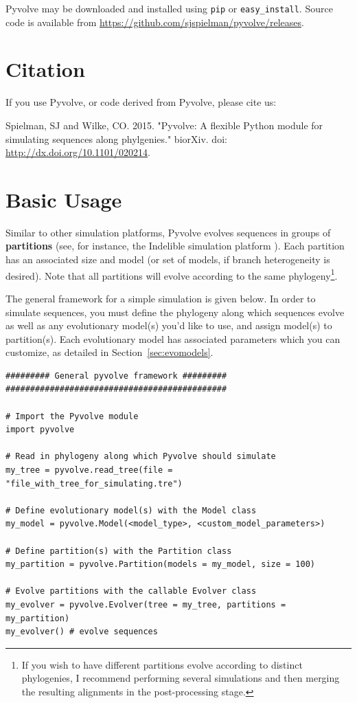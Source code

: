\documentclass{article}
\newcommand{\code}[1]{\texttt{\small{#1}}}
\begin{document}
Pyvolve may be downloaded and installed using \code{pip} or \code{easy\_install}. Source code is available from \href{https://github.com/sjspielman/pyvolve/releases}{https://github.com/sjspielman/pyvolve/releases}.

\section{Citation}

If you use Pyvolve, or code derived from Pyvolve, please cite us:

Spielman, SJ and Wilke, CO. 2015. "Pyvolve: A flexible Python module for simulating sequences along phylgenies." biorXiv. doi: \href{http://dx.doi.org/10.1101/020214}{http://dx.doi.org/10.1101/020214}.

\section{Basic Usage}

Similar to other simulation platforms, Pyvolve evolves sequences in groups of \textbf{partitions} (see, for instance, the Indelible simulation platform \citep{Fletcher2009}). Each partition has an associated size and model (or set of models, if branch heterogeneity is desired). Note that all partitions will evolve according to the same phylogeny\footnote{If you wish to have different partitions evolve according to distinct phylogenies, I recommend performing several simulations and then merging the resulting alignments in the post-processing stage.}. 

The general framework for a simple simulation is given below. In order to simulate sequences, you must define the phylogeny along which sequences evolve as well as any evolutionary model(s) you'd like to use, and assign model(s) to partition(s). Each evolutionary model has associated parameters which you can customize, as detailed in Section~\ref{sec:evomodels}.

\begin{lstlisting}
######### General pyvolve framework #########
#############################################

# Import the Pyvolve module
import pyvolve

# Read in phylogeny along which Pyvolve should simulate
my_tree = pyvolve.read_tree(file = "file_with_tree_for_simulating.tre")

# Define evolutionary model(s) with the Model class
my_model = pyvolve.Model(<model_type>, <custom_model_parameters>)

# Define partition(s) with the Partition class
my_partition = pyvolve.Partition(models = my_model, size = 100)

# Evolve partitions with the callable Evolver class
my_evolver = pyvolve.Evolver(tree = my_tree, partitions = my_partition)
my_evolver() # evolve sequences
\end{lstlisting}
\end{document}
